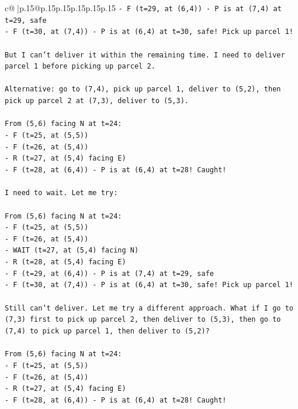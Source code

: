 \documentclass{article}
\begin{document}
{\begin{supertabular}{c@{$\;$}|p{.15\linewidth}@{}p{.15\linewidth}p{.15\linewidth}p{.15\linewidth}p{.15\linewidth}p{.15\linewidth}}
{{{\texttt{{-} F (t=29, at (6,4)) {-} P is at (7,4) at t=29, safe} \\
\texttt{{-} F (t=30, at (7,4)) {-} P is at (6,4) at t=30, safe! Pick up parcel 1!} \\
\\ 
\texttt{But I can't deliver it within the remaining time. I need to deliver parcel 1 before picking up parcel 2.} \\
\\ 
\texttt{Alternative: go to (7,4), pick up parcel 1, deliver to (5,2), then pick up parcel 2 at (7,3), deliver to (5,3).} \\
\\ 
\texttt{From (5,6) facing N at t=24:} \\
\texttt{{-} F (t=25, at (5,5))} \\
\texttt{{-} F (t=26, at (5,4))} \\
\texttt{{-} R (t=27, at (5,4) facing E)} \\
\texttt{{-} F (t=28, at (6,4)) {-} P is at (6,4) at t=28! Caught!} \\
\\ 
\texttt{I need to wait. Let me try:} \\
\\ 
\texttt{From (5,6) facing N at t=24:} \\
\texttt{{-} F (t=25, at (5,5))} \\
\texttt{{-} F (t=26, at (5,4))} \\
\texttt{{-} WAIT (t=27, at (5,4) facing N)} \\
\texttt{{-} R (t=28, at (5,4) facing E)} \\
\texttt{{-} F (t=29, at (6,4)) {-} P is at (7,4) at t=29, safe} \\
\texttt{{-} F (t=30, at (7,4)) {-} P is at (6,4) at t=30, safe! Pick up parcel 1!} \\
\\ 
\texttt{Still can't deliver. Let me try a different approach. What if I go to (7,3) first to pick up parcel 2, then deliver to (5,3), then go to (7,4) to pick up parcel 1, then deliver to (5,2)?} \\
\\ 
\texttt{From (5,6) facing N at t=24:} \\
\texttt{{-} F (t=25, at (5,5))} \\
\texttt{{-} F (t=26, at (5,4))} \\
\texttt{{-} R (t=27, at (5,4) facing E)} \\
\texttt{{-} F (t=28, at (6,4)) {-} P is at (6,4) at t=28! Caught!} \\
}}}
\end{supertabular}}
\end{document}
